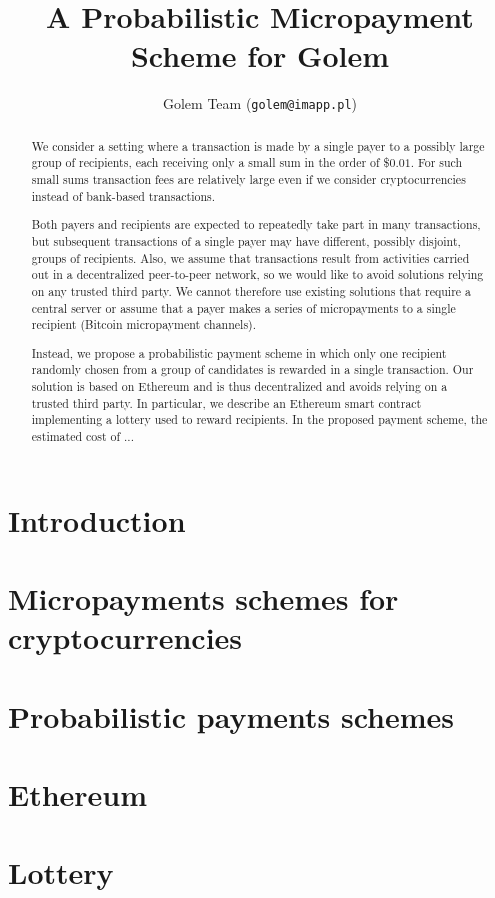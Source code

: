 \documentclass[a4paper]{article}
\title{A Probabilistic Micropayment Scheme for Golem}
\author{Golem Team (\texttt{golem@imapp.pl})}
\begin{document}
\maketitle

\begin{abstract}
  We consider a setting where a transaction is made by a single payer
  to a possibly large group of recipients, each receiving only a small
  sum in the order of \$$0.01$. For such small sums transaction fees are
  relatively large even if we consider cryptocurrencies instead of
  bank-based transactions.

  Both payers and recipients are expected to repeatedly take part in
  many transactions, but subsequent transactions of a single payer may
  have different, possibly disjoint, groups of recipients. Also, we
  assume that transactions result from activities carried out in a
  decentralized peer-to-peer network, so we would like to avoid
  solutions relying on any trusted third party. We cannot therefore use
  existing solutions that require a central server or assume that a
  payer makes a series of micropayments to a single recipient (Bitcoin
  micropayment channels).

  Instead, we propose a probabilistic payment scheme in which only one
  recipient randomly chosen from a group of candidates is rewarded in
  a single transaction. Our solution is based on Ethereum and is thus
  decentralized and avoids relying on a trusted third party. In
  particular, we describe an Ethereum smart contract implementing a
  lottery used to reward recipients. In the proposed payment scheme,
  the estimated cost of ...
\end{abstract}

\section{Introduction}
\section{Micropayments schemes for cryptocurrencies}
\section{Probabilistic payments schemes}
\section{Ethereum}
\section{Lottery}
\end{document}

